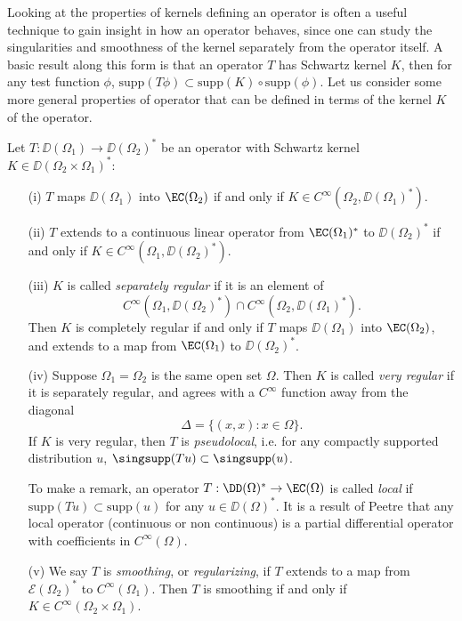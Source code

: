 Looking at the properties of kernels defining an operator is often a useful technique to gain insight in how an operator behaves, since one can study the singularities and smoothness of the kernel separately from the operator itself. A basic result along this form is that an operator $T$ has Schwartz kernel $K$, then for any test function $\phi$, $\text{supp}(T\phi) \subset \text{supp}(K) \circ \text{supp}(\phi)$. Let us consider some more general properties of operator that can be defined in terms of the kernel $K$ of the operator.

\begin{theorem}
    Let $T: \DD(\Omega_1) \to \DD(\Omega_2)^*$ be an operator with Schwartz kernel $K \in \DD(\Omega_2 \times \Omega_1)^*$:
\begin{itemize}
    \item[(i)] $T$ maps $\DD(\Omega_1)$ into $\EC(\Omega_2)$ if and only if $K \in C^\infty(\Omega_2, \DD(\Omega_1)^*)$.

    \item[(ii)] $T$ extends to a continuous linear operator from $\EC(\Omega_1)^*$ to $\DD(\Omega_2)^*$ if and only if $K \in C^\infty(\Omega_1, \DD(\Omega_2)^*)$.

    \item[(iii)] $K$ is called \emph{separately regular} if it is an element of
    \[ C^\infty(\Omega_1, \DD(\Omega_2)^*) \cap C^\infty(\Omega_2, \DD(\Omega_1)^*). \]
    Then $K$ is completely regular if and only if $T$ maps $\DD(\Omega_1)$ into $\EC(\Omega_2)$, and extends to a map from $\EC(\Omega_1)$ to $\DD(\Omega_2)^*$.

    \item[(iv)] Suppose $\Omega_1 = \Omega_2$ is the same open set $\Omega$. Then $K$ is called \emph{very regular} if it is separately regular, and agrees with a $C^\infty$ function away from the diagonal
    \[ \Delta = \{ (x,x) : x \in \Omega \}. \]
    If $K$ is very regular, then $T$ is \emph{pseudolocal}, i.e. for any compactly supported distribution $u$, $\singsupp(Tu) \subset \singsupp(u)$.

    To make a remark, an operator $T: \DD(\Omega)^* \to \EC(\Omega)$ is called \emph{local} if $\text{supp}(Tu) \subset \text{supp}(u)$ for any $u \in \DD(\Omega)^*$. It is a result of Peetre that any local operator (continuous or non continuous) is a partial differential operator with coefficients in $C^\infty(\Omega)$.

    \item[(v)] We say $T$ is \emph{smoothing}, or \emph{regularizing}, if $T$ extends to a map from $\mathcal{E}(\Omega_2)^*$ to $C^\infty(\Omega_1)$. Then $T$ is smoothing if and only if $K \in C^\infty(\Omega_2 \times \Omega_1)$.


\end{itemize}
\end{theorem}
